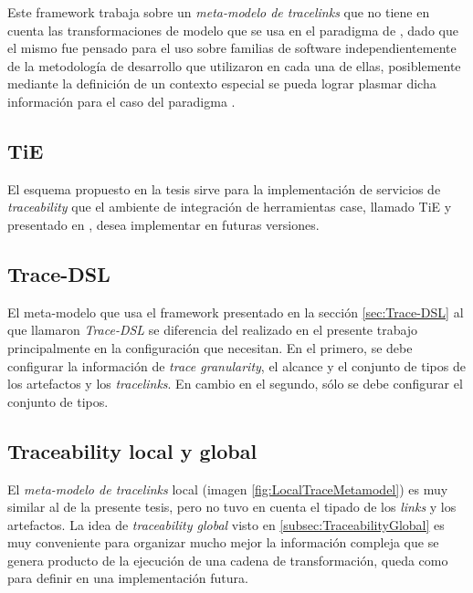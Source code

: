 \documentclass[a4paper,12pt,oneside,spanish]{book}
\begin{document}
Este framework trabaja sobre un \textit{meta-modelo de tracelinks} que no tiene en cuenta las transformaciones de modelo que se usa en el paradigma de , dado que el mismo fue pensado para el uso sobre familias de software independientemente de la metodología de desarrollo que utilizaron en cada una de ellas, posiblemente mediante la definición de un contexto especial se pueda lograr plasmar dicha información para el caso del paradigma .


\subsection*{TiE}

El esquema propuesto en la tesis sirve para la implementación de servicios de \textit{traceability} que el ambiente de integración de herramientas \gls{case}, llamado \textsf{TiE} y presentado en \cite{KlarRoseSchurr}, desea implementar en futuras versiones.


\subsection*{Trace-DSL}

El meta-modelo que usa el framework presentado en la sección \ref{sec:Trace-DSL} al que llamaron \textsl{Trace-DSL} se diferencia del realizado en el presente trabajo principalmente en la configuración que necesitan. En el primero, se debe configurar la información de \textit{trace granularity}, el alcance y el conjunto de tipos de los artefactos y los \textit{tracelinks}. En cambio en el segundo, sólo se debe configurar el conjunto de tipos.


\subsection*{Traceability local y global}

El \textit{meta-modelo de tracelinks} local (imagen \ref{fig:LocalTraceMetamodel}) es muy similar al de la presente tesis, pero no tuvo en cuenta el tipado de los \textit{links} y los artefactos. La idea de \textit{traceability global} visto en \ref{subsec:TraceabilityGlobal} es muy conveniente para organizar mucho mejor la información compleja que se genera producto de la ejecución de una cadena de transformación, queda como para definir en una implementación futura.



\backmatter

\lhead[]{\leftmark}
\end{document}
